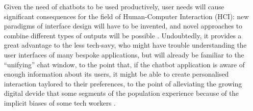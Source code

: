 Given the need of chatbots to be used productively, user needs will cause significant consequences for the field of Human-Computer Interaction (HCI): new paradigms of interface design will have to be invented, and novel approaches to combine different types of outputs will be possible \cite{Følstad2017}. Undoubtedly, it provides a great advantage to the less tech-savy, who might have trouble understanding the user interfaces of many bespoke applications, but will already be familiar to the ``unifying'' chat window, to the point that, if the chatbot application is aware of enough information about its users, it might be able to create personalised interaction taylored to their preferences, to the point of alleviating the growing digital devide that some segments of the population experience because of the implicit biases of some tech workers \cite{Brandtzæg2011}.

